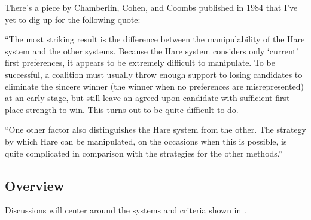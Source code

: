 \begin{boxcomment}
    There's a piece by Chamberlin, Cohen, and Coombs published in 1984 that I've yet to dig up for the following quote:

    ``The most striking result is the difference between the manipulability of the Hare system and the other systems. Because the Hare system considers only `current' first preferences, it appears to be extremely difficult to manipulate. To be successful, a coalition must usually throw enough support to losing candidates to eliminate the sincere winner (the winner when no preferences are misrepresented) at an early stage, but still leave an agreed upon candidate with sufficient first-place strength to win. This turns out to be quite difficult to do.

    ``One other factor also distinguishes the Hare system from the other. The strategy by which Hare can be manipulated, on the occasions when this is possible, is quite complicated in comparison with the strategies for the other methods.''
\end{boxcomment}

\subsection{Overview}

Discussions will center around the systems and criteria shown in .



